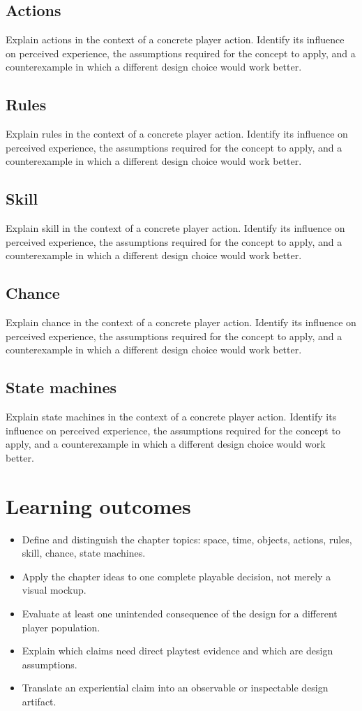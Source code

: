 \documentclass[11pt]{article}
\begin{document}
\subsection{Actions}
Explain actions in the context of a concrete player action. Identify its influence on perceived experience, the assumptions required for the concept to apply, and a counterexample in which a different design choice would work better.


\subsection{Rules}
Explain rules in the context of a concrete player action. Identify its influence on perceived experience, the assumptions required for the concept to apply, and a counterexample in which a different design choice would work better.


\subsection{Skill}
Explain skill in the context of a concrete player action. Identify its influence on perceived experience, the assumptions required for the concept to apply, and a counterexample in which a different design choice would work better.


\subsection{Chance}
Explain chance in the context of a concrete player action. Identify its influence on perceived experience, the assumptions required for the concept to apply, and a counterexample in which a different design choice would work better.


\subsection{State machines}
Explain state machines in the context of a concrete player action. Identify its influence on perceived experience, the assumptions required for the concept to apply, and a counterexample in which a different design choice would work better.


\section{Learning outcomes}
\begin{itemize}
\item Define and distinguish the chapter topics: space, time, objects, actions, rules, skill, chance, state machines.
\item Apply the chapter ideas to one complete playable decision, not merely a visual mockup.
\item Evaluate at least one unintended consequence of the design for a different player population.
\item Explain which claims need direct playtest evidence and which are design assumptions.
\item Translate an experiential claim into an observable or inspectable design artifact.
\end{itemize}
\end{document}
